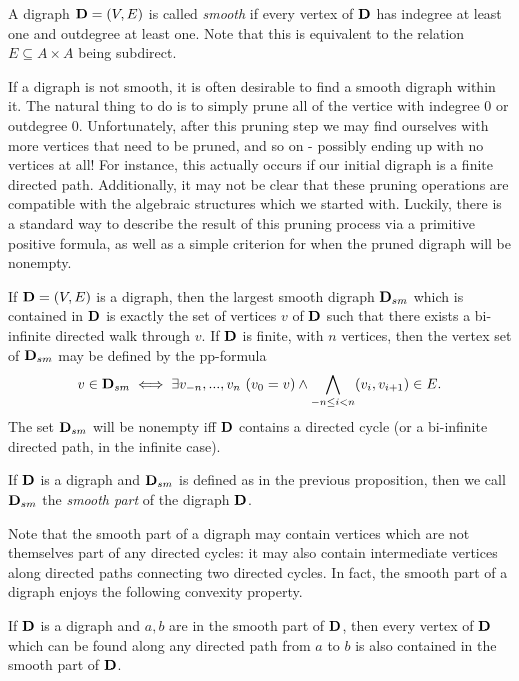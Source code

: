 \documentclass[letterpaper,11pt]{article}
\begin{document}
\begin{defn} A digraph $\mathbf{D} = (V,E)$ is called \emph{smooth} if every vertex of $\mathbf{D}$ has indegree at least one and outdegree at least one. Note that this is equivalent to the relation $E \subseteq A\times A$ being subdirect.
\end{defn}

If a digraph is not smooth, it is often desirable to find a smooth digraph within it. The natural thing to do is to simply prune all of the vertice with indegree $0$ or outdegree $0$. Unfortunately, after this pruning step we may find ourselves with more vertices that need to be pruned, and so on - possibly ending up with no vertices at all! For instance, this actually occurs if our initial digraph is a finite directed path. Additionally, it may not be clear that these pruning operations are compatible with the algebraic structures which we started with. Luckily, there is a standard way to describe the result of this pruning process via a primitive positive formula, as well as a simple criterion for when the pruned digraph will be nonempty.

\begin{prop} If $\mathbf{D} = (V,E)$ is a digraph, then the largest smooth digraph $\mathbf{D}_{sm}$ which is contained in $\mathbf{D}$ is exactly the set of vertices $v$ of $\mathbf{D}$ such that there exists a bi-infinite directed walk through $v$. If $\mathbf{D}$ is finite, with $n$ vertices, then the vertex set of $\mathbf{D}_{sm}$ may be defined by the pp-formula
\[
v \in \mathbf{D}_{sm} \iff \exists v_{-n}, ..., v_n\ (v_0 = v) \wedge \bigwedge_{-n \le i < n} (v_i,v_{i+1}) \in E.
\]
The set $\mathbf{D}_{sm}$ will be nonempty iff $\mathbf{D}$ contains a directed cycle (or a bi-infinite directed path, in the infinite case).
\end{prop}

\begin{defn} If $\mathbf{D}$ is a digraph and $\mathbf{D}_{sm}$ is defined as in the previous proposition, then we call $\mathbf{D}_{sm}$ the \emph{smooth part} of the digraph $\mathbf{D}$.
\end{defn}

Note that the smooth part of a digraph may contain vertices which are not themselves part of any directed cycles: it may also contain intermediate vertices along directed paths connecting two directed cycles. In fact, the smooth part of a digraph enjoys the following convexity property.

\begin{prop} If $\mathbf{D}$ is a digraph and $a,b$ are in the smooth part of $\mathbf{D}$, then every vertex of $\mathbf{D}$ which can be found along any directed path from $a$ to $b$ is also contained in the smooth part of $\mathbf{D}$.
\end{prop}
\end{document}
